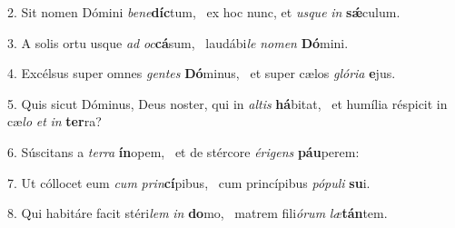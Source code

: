 2. Sit nomen Dómini \textit{be}\textit{ne}\textbf{díc}tum, \ast\  ex hoc nunc, et \textit{us}\textit{que} \textit{in} \textbf{sǽ}culum.\

3. A solis ortu usque \textit{ad} \textit{oc}\textbf{cá}sum, \ast\  laudábi\textit{le} \textit{no}\textit{men} \textbf{Dó}mini.\

4. Excélsus super omnes \textit{gen}\textit{tes} \textbf{Dó}minus, \ast\  et super cælos \textit{gló}\textit{ri}\textit{a} \textbf{e}jus.\

5. Quis sicut Dóminus, Deus noster, qui in \textit{al}\textit{tis} \textbf{há}bitat, \ast\  et humília réspicit in cæ\textit{lo} \textit{et} \textit{in} \textbf{ter}ra?\

6. Súscitans a \textit{ter}\textit{ra} \textbf{ín}opem, \ast\  et de stércore \textit{é}\textit{ri}\textit{gens} \textbf{páu}perem:\

7. Ut cóllocet eum \textit{cum} \textit{prin}\textbf{cí}pibus, \ast\  cum princípibus \textit{pó}\textit{pu}\textit{li} \textbf{su}i.\

8. Qui habitáre facit stéri\textit{lem} \textit{in} \textbf{do}mo, \ast\  matrem fili\textit{ó}\textit{rum} \textit{læ}\textbf{tán}tem.\

